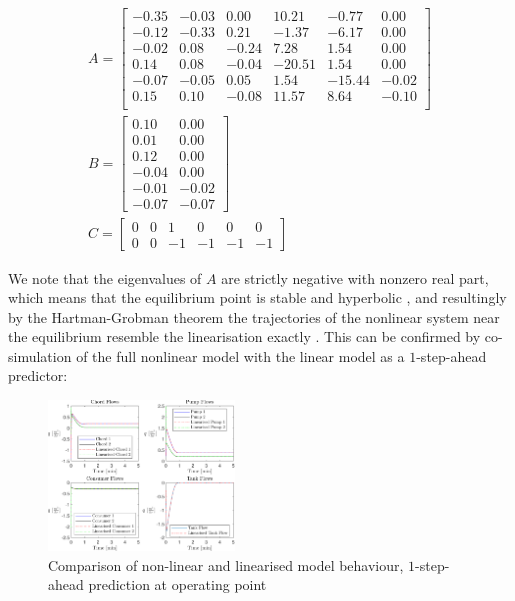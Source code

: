 \begin{equation}\label{eq:LinearisedModelWithTank}
\begin{gathered}
	A = \begin{bmatrix}
		-0.35 & -0.03 & 0.00 & 10.21 & -0.77 & 0.00\\
		-0.12 & -0.33 & 0.21 & -1.37 & -6.17  & 0.00\\
		-0.02 & 0.08 & -0.24 & 7.28 & 1.54 & 0.00\\
		0.14 & 0.08 & -0.04 & -20.51 & 1.54 & 0.00\\
		-0.07 & -0.05 & 0.05 & 1.54 & -15.44 &   -0.02\\
		0.15 & 0.10 & -0.08 & 11.57 & 8.64 & -0.10\\
	\end{bmatrix} \\
	B = \begin{bmatrix}
		0.10 & 0.00\\
		0.01 & 0.00 \\
		0.12 & 0.00 \\
		-0.04 & 0.00 \\
		-0.01 & -0.02\\
		-0.07 & -0.07
	\end{bmatrix}
\\
		C = \begin{bmatrix} 
			0 & 0 & 1 & 0 & 0 & 0	\\		
			0 & 0 & -1 & -1 & -1 & -1
		\end{bmatrix}
\end{gathered}
\end{equation}

We note that the eigenvalues of $A$ are strictly negative with nonzero real part, which means that the equilibrium point is stable and hyperbolic \cite{Khalil}, and resultingly by the Hartman-Grobman theorem the trajectories of the nonlinear system near the equilibrium resemble the linearisation exactly \cite{Perko2001}. This can be confirmed by co-simulation of the full nonlinear model with the linear model as a $1$-step-ahead predictor:


\begin{figure}[h]
	\centering
	\includegraphics[height = 4cm,width=\linewidth]{Graphics/NominalFlows.pdf}
	\caption{Comparison of non-linear and linearised model behaviour, $1$-step-ahead prediction at operating point}
	\label{fig:CompNonLinEQ}
\end{figure}

